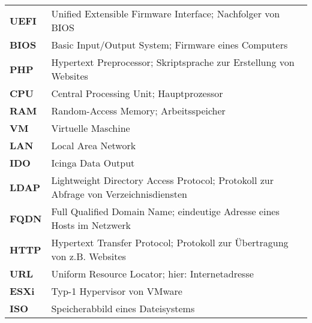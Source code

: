 \begin{table}[htb!]
\begin{tabular}{ll}
{\color[HTML]{000000} \textbf{UEFI}} & {\color[HTML]{000000} Unified Extensible Firmware Interface;   Nachfolger von BIOS}                           \\
{\color[HTML]{000000} \textbf{BIOS}} & {\color[HTML]{000000} Basic Input/Output System; Firmware eines Computers}                                    \\
{\color[HTML]{000000} \textbf{PHP}}  & {\color[HTML]{000000} Hypertext Preprocessor; Skriptsprache zur Erstellung von Websites}                      \\
{\color[HTML]{000000} \textbf{CPU}}  & {\color[HTML]{000000} Central Processing Unit; Hauptprozessor}                                                \\
{\color[HTML]{000000} \textbf{RAM}}  & {\color[HTML]{000000} Random-Access Memory; Arbeitsspeicher}                                                  \\
{\color[HTML]{000000} \textbf{VM}}   & {\color[HTML]{000000} Virtuelle Maschine}                                                                     \\
{\color[HTML]{000000} \textbf{LAN}}  & {\color[HTML]{000000} Local Area Network}                                                                     \\
{\color[HTML]{000000} \textbf{IDO}}  & {\color[HTML]{000000} Icinga Data Output}                                                                     \\
{\color[HTML]{000000} \textbf{LDAP}} & {\color[HTML]{000000} Lightweight Directory Access Protocol; Protokoll zur Abfrage von   Verzeichnisdiensten} \\
{\color[HTML]{000000} \textbf{FQDN}} & {\color[HTML]{000000} Full Qualified Domain Name; eindeutige Adresse eines Hosts im Netzwerk}                 \\
{\color[HTML]{000000} \textbf{HTTP}} & {\color[HTML]{000000} Hypertext Transfer Protocol; Protokoll zur Übertragung von z.B. Websites}               \\
{\color[HTML]{000000} \textbf{URL}}  & {\color[HTML]{000000} Uniform Resource Locator; hier: Internetadresse}                                        \\
{\color[HTML]{000000} \textbf{ESXi}} & {\color[HTML]{000000} Typ-1 Hypervisor von VMware}                                                            \\
{\color[HTML]{000000} \textbf{ISO}}  & {\color[HTML]{000000} Speicherabbild eines Dateisystems}                                                     
\end{tabular}
\end{table}